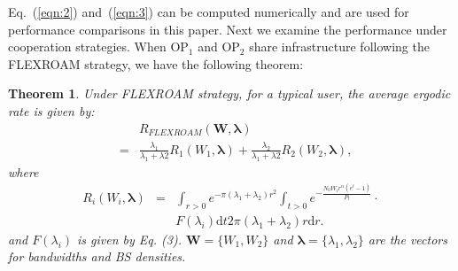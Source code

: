 \documentclass[conference]{IEEEtran}
\newtheorem{theorem}{\textbf{Theorem}}
\begin{document}
Eq.~(\ref{eqn:2}) and~(\ref{eqn:3}) can be computed numerically and are used for performance comparisons in this paper. Next we examine the performance under cooperation strategies. When OP$_1$ and OP$_2$ share infrastructure following the FLEXROAM strategy, we have the following theorem:
\begin{theorem}
Under FLEXROAM strategy, for a typical user, the average ergodic rate is given by:
\begin{eqnarray}
&&R_{FLEXROAM}(\mathbf{W}, \boldsymbol \lambda) \nonumber \\
&=& \frac{\lambda_1}{\lambda_1 + \lambda2}R_{1}(W_1, \boldsymbol \lambda) + \frac{\lambda_2}{\lambda_1 + \lambda2}R_{2}(W_2, \boldsymbol \lambda),
\end{eqnarray}
where
\begin{eqnarray}
R_{i}(W_i, \boldsymbol \lambda) &=& \int_{r>0}e^{-\pi (\lambda_1 + \lambda_2) r^2} \int_{t>0}e^{-\frac{N_0 W_i r^\alpha (e^t - 1)}{P_t}} \cdot \nonumber \\
&&F(\lambda_i) \mbox{d}t 2\pi (\lambda_1 + \lambda_2) r \mbox{d}r.
\end{eqnarray}
and $F(\lambda_i)$ is given by Eq. (3). $\mathbf{W} = \{W_1, W_2\}$ and $\boldsymbol \lambda = \{\lambda_1, \lambda_2\}$ are the vectors for bandwidths and BS densities.
\end{theorem}
\end{document}
